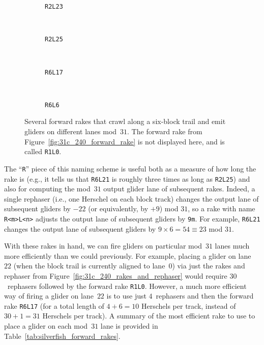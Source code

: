 \begin{figure}[!htb]
	\centering
	\begin{minipage}{0.3\textwidth}
		\begin{subfigure}{\linewidth}
			\centering
			\caption{\texttt{R2L23}}\label{fig:R2L23}
		\end{subfigure} \\[0.1cm] \begin{subfigure}{\linewidth}
			\centering
			\caption{\texttt{R2L25}}\label{fig:R2L25}
		\end{subfigure}
	\end{minipage} \ \ \ \begin{subfigure}{0.66\textwidth}
		\centering
		\caption{\texttt{R6L17}}\label{fig:R6L17}
	\end{subfigure} \\[0.1cm]
	\begin{subfigure}{0.495\textwidth}
		\centering
		\caption{\texttt{R6L6}}\label{fig:R6L6}
	\end{subfigure}
	\caption{Several forward rakes that crawl along a six-block trail and emit gliders on different lanes mod~$31$. The forward rake from Figure~\ref{fig:31c_240_forward_rake} is not displayed here, and is called \texttt{R1L0}.}\label{fig:31c_240_forerakes}
\end{figure}

The ``\texttt{R}'' piece of this naming scheme is useful both as a measure of how long the rake is (e.g., it tells us that \texttt{R6L21} is roughly three times as long as \texttt{R2L25}) and also for computing the mod~$31$ output glider lane of subsequent rakes. Indeed, a single rephaser (i.e., one Herschel on each block track) changes the output lane of subsequent gliders by $-22$ (or equivalently, by $+9$) mod $31$, so a rake with name \texttt{R<m>L<n>} adjusts the output lane of subsequent gliders by \texttt{9m}. For example, \texttt{R6L21} changes the output lane of subsequent gliders by $9 \times 6 = 54 \equiv 23$ mod $31$.

With these rakes in hand, we can fire gliders on particular mod~$31$ lanes much more efficiently than we could previously. For example, placing a glider on lane~$22$ (when the block trail is currently aligned to lane~$0$) via just the rakes and rephaser from Figure~\ref{fig:31c_240_rakes_and_rephaser} would require $30$~rephasers followed by the forward rake \texttt{R1L0}. However, a much more efficient way of firing a glider on lane~$22$ is to use just $4$~rephasers and then the forward rake \texttt{R6L17} (for a total length of $4 + 6 = 10$ Herschels per track, instead of $30 + 1 = 31$ Herschels per track). A summary of the most efficient rake to use to place a glider on each mod~$31$ lane is provided in Table~\ref{tab:silverfish_forward_rakes}.

